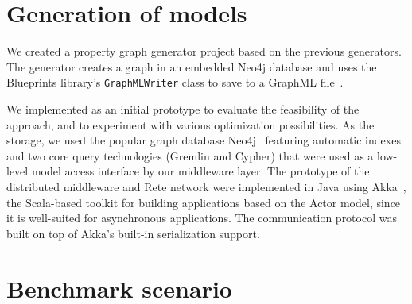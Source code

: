 \section{Generation of models}

We created a property graph generator project based on the previous \tb generators. The generator creates a graph in an embedded Neo4j database and uses the Blueprints library's \texttt{GraphMLWriter} class to save to a GraphML file~\cite{Blueprints}.



We implemented \iqd{} as an initial prototype to evaluate the feasibility of the approach, and to experiment with various optimization possibilities. As the storage, we used the popular graph database Neo4j~\cite{neo4j} featuring automatic indexes and two core query technologies (Gremlin and Cypher) that were used as a low-level model access interface by our middleware layer.
The prototype of the distributed middleware and Rete network were implemented in Java using Akka~\cite{akka}, the Scala-based toolkit for building applications based on the Actor model, since it is well-suited for asynchronous applications. The communication protocol was built on top of Akka's built-in serialization support.






\section{Benchmark scenario}

